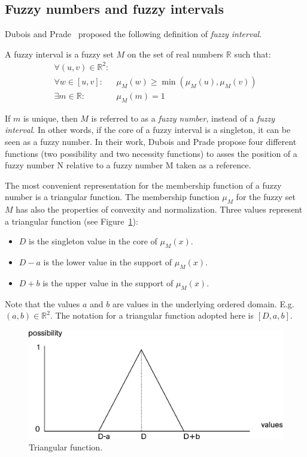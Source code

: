 \subsection{\label{subsec:fuzzy-numbers}Fuzzy numbers and fuzzy intervals}
Dubois and Prade~\cite{Dubois1983} proposed the following definition of \emph{fuzzy interval}.
\begin{definition}
A fuzzy interval is a fuzzy set $M$ on the set of real numbers $\mathbb{R}$ such that:
\begin{eqnarray}
\forall (u,v)\in\mathbb{R}^2:&\\
\nonumber
\forall w \in [u,v]:&\mu_M(w) \geq\min(\mu_M(u),\mu_M(v))  \\
\exists m \in \mathbb{R}:& \mu_M(m)=1 
\end{eqnarray}
\end{definition}
If $m$ is unique, then $M$ is referred to as a \emph{fuzzy number}, instead of a \emph{fuzzy interval}. In other words, if the core of a fuzzy interval is a singleton, it can be seen as a fuzzy number. In their work, Dubois and Prade propose four different functions (two possibility and two necessity functions) to asses the position of a fuzzy number N relative to  a fuzzy number M taken as a reference.

The most convenient representation for the membership function of a fuzzy number is a triangular function. The membership function $\mu_M$ for the fuzzy set $M$ has also the properties of convexity and normalization. Three values represent a triangular function (see Figure~\ref{fig:triangular}):
\begin{itemize}
\item
$D$ is the singleton value in the core of $\mu_M(x)$.
\item
$D-a$ is the lower value in the support of $\mu_M(x)$. 
\item
$D+b$ is the upper value in the support of $\mu_M(x)$.
\end{itemize}
Note that the values $a$ and $b$ are values in the underlying ordered domain. E.g. $(a,b) \in \mathbb{R}^2$. The notation for a triangular function adopted here is $[D,a,b]$.
\begin{figure}[h!]
  \centering
  \includegraphics[scale=0.4]{graphs/triangular.eps}
  \caption{Triangular function.}
  \label{fig:triangular}
\end{figure}

